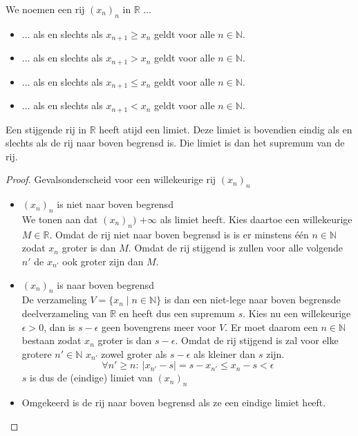 \documentclass[main.tex]{subfiles}
\begin{document}
\begin{de}
  We noemen een rij $(x_{n})_{n}$ in $\mathbb{R}$ ...
  \begin{itemize}
  \item ...  als en slechts als $x_{n+1} \ge x_{n}$ geldt voor alle $n\in \mathbb{N}$.  
  \item ...  als en slechts als $x_{n+1} > x_{n}$ geldt voor alle $n\in \mathbb{N}$.  
  \item ...  als en slechts als $x_{n+1} \le x_{n}$ geldt voor alle $n\in \mathbb{N}$.  
  \item ...  als en slechts als $x_{n+1} < x_{n}$ geldt voor alle $n\in \mathbb{N}$.  
  \end{itemize}
\end{de}

\begin{bst}
  \label{st:stijgend-dan-limiet}
  Een stijgende rij in $\mathbb{R}$ heeft atijd een limiet.
  Deze limiet is bovendien eindig als en slechts als de rij naar boven begrensd is.
  Die limiet is dan het supremum van de rij.

  \begin{proof}
    Gevalsonderscheid voor een willekeurige rij $(x_{n})_{n}$
    \begin{itemize}
    \item $(x_{n})_{n}$ is niet naar boven begrensd\\
      We tonen aan dat $(x_{n})_{n})$ $+\infty$ als limiet heeft.
      Kies daartoe een willekeurige $M\in\mathbb{R}$.
      Omdat de rij niet naar boven begrensd is is er minstens \'e\'en $n\in \mathbb{N}$ zodat $x_{n}$ groter is dan $M$.
      Omdat de rij stijgend is zullen voor alle volgende $n'$ de $x_{n'}$ ook groter zijn dan $M$.
    \item $(x_{n})_{n}$ is naar boven begrensd\\
      De verzameling $V = \{x_{n}\mid n\in \mathbb{N}\}$ is dan een niet-lege naar boven begrensde deelverzameling van $\mathbb{R}$ en heeft dus een supremum $s$.
      Kies nu een willekeurige $\epsilon > 0$, dan is $s-\epsilon$ geen bovengrens meer voor $V$.
      Er moet daarom een $n\in \mathbb{N}$ bestaan zodat $x_{n}$ groter is dan $s-\epsilon$.
      Omdat de rij stijgend is zal voor elke grotere $n'\in \mathbb{N}$ $x_{n'}$ zowel groter als $s-\epsilon$ als kleiner dan $s$ zijn.
      \[ \forall n' \ge n:\ |x_{n'}-s| = s-x_{n'} \le x_{n}-s < \epsilon \]
      $s$ is dus de (eindige) limiet van $(x_{n})_{n}$
    \item Omgekeerd is de rij naar boven begrensd als ze een eindige limiet heeft.
    \end{itemize}
  \end{proof}
\end{bst}
\end{document}
